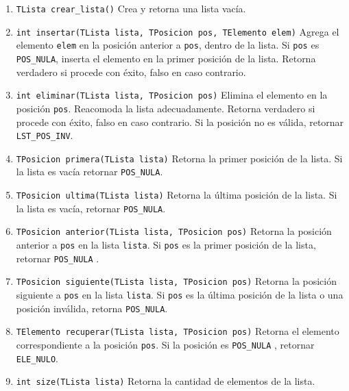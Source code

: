 \documentclass[12pt,a4paper]{article}
\begin{document}
\begin{enumerate}
	
	\item \texttt{TLista crear\_lista()} Crea y retorna una lista vacía.
	
	\item \texttt{int insertar(TLista lista, TPosicion pos, TElemento elem)} Agrega el elemento \texttt{elem} en la posición anterior a \texttt{pos}, dentro de la lista. Si \texttt{pos} es \texttt{POS\_NULA}, inserta el elemento en la primer posición de la lista. Retorna verdadero si procede con éxito, falso en caso contrario.
	
	\item \texttt{int eliminar(TLista lista, TPosicion pos)} Elimina el elemento en la posición \texttt{pos}. Reacomoda la lista adecuadamente. Retorna verdadero si procede con éxito, falso en caso contrario. Si la posición no es válida, retornar \texttt{LST\_POS\_INV}.
	
	\item \texttt{TPosicion primera(TLista lista)} Retorna la primer posición de la lista. Si la lista es vacía retornar \texttt{POS\_NULA}.
	
	\item \texttt{TPosicion ultima(TLista lista)} Retorna la última posición de la lista. Si la lista es vacía, retornar \texttt{POS\_NULA}.
	
	\item \texttt{TPosicion anterior(TLista lista, TPosicion pos)} Retorna la posición anterior a \texttt{pos} en la lista \texttt{lista}. Si \texttt{pos} es la primer posición de la lista, retornar \texttt{POS\_NULA} .
	
	\item \texttt{TPosicion siguiente(TLista lista, TPosicion pos)} Retorna la posición siguiente a \texttt{pos} en la lista \texttt{lista}. Si \texttt{pos} es la última posición de la lista o una posición inválida, retorna \texttt{POS\_NULA}.
	
	\item \texttt{TElemento recuperar(TLista lista, TPosicion pos)} Retorna el elemento correspondiente a la posición \texttt{pos}. Si la posición es \texttt{POS\_NULA} , retornar \texttt{ELE\_NULO}.

	\item \texttt{int size(TLista lista)} Retorna la cantidad de elementos de la lista.	
	
\end{enumerate}
\end{document}
